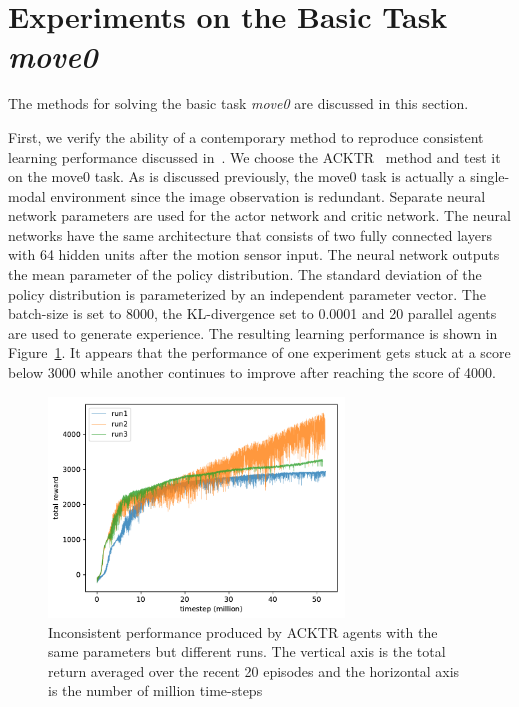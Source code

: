 
\section{Experiments on the Basic Task \textit{move0}}\label{sec_exp_move0}

The methods for solving the basic task \textit{move0} are discussed in this section.

First, we verify the ability of a contemporary method to reproduce consistent learning performance discussed in~\cite{henderson2017matters}. We choose the ACKTR~\cite{wu2017scalable} method and test it on the move0 task. As is discussed previously, the move0 task is actually a single-modal environment since the image observation is redundant. Separate neural network parameters are used for the actor network and critic network. The neural networks have the same architecture that consists of two fully connected layers with 64 hidden units after the motion sensor input. The neural network outputs the mean parameter of the policy distribution. The standard deviation of the policy distribution is parameterized by an independent parameter vector. The batch-size is set to 8000, the KL-divergence set to 0.0001 and 20 parallel agents are used to generate experience. The resulting learning performance is shown in Figure~\ref{fig_acktr_reprod}. It appears that the performance of one experiment gets stuck at a score below 3000 while another continues to improve after reaching the score of 4000. 
\begin{figure}[!htbp]
	\includegraphics[width=0.7\textwidth]{images/rec_0403_reprod}
	\centering
	\caption{Inconsistent performance produced by ACKTR agents with the same  parameters but different runs. The vertical axis is the total return averaged over the recent 20 episodes and the horizontal axis is the number of million time-steps}\label{fig_acktr_reprod}
\end{figure}

